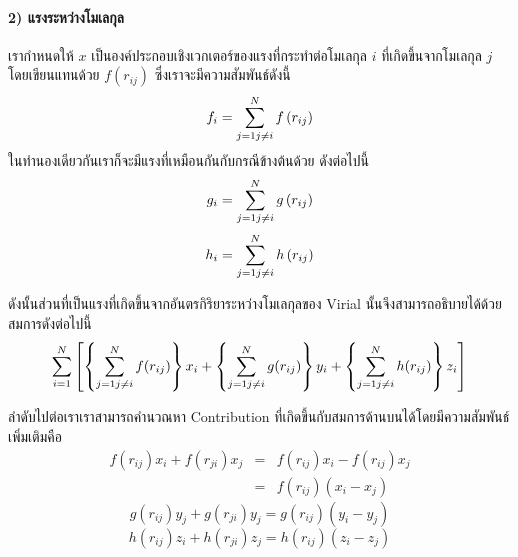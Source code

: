 \paragraph{2) แรงระหว่างโมเลกุล} เรากำหนดให้ $x$ เป็นองค์ประกอบเชิงเวกเตอร์ของแรงที่กระทำต่อโมเลกุล $i$ ที่เกิดขึ้นจากโมเลกุล $j$ โดยเขียนแทนด้วย $f(r_{ij})$ ซึ่งเราจะมีความสัมพันธ์ดังนี้
%
\begin{equation}
    f_i 
    = 
    \sum_{j=1 \\ j\neq i}^{N} f\left( r_{ij}\right)
\end{equation}
%
ในทำนองเดียวกันเราก็จะมีแรงที่เหมือนกันกับกรณีข้างต้นด้วย ดังต่อไปนี้
%
\begin{equation}
    g_i 
    = 
    \sum_{j=1 \\ j\neq i}^{N} g\left( r_{ij}\right)
\end{equation}
%
\begin{equation}
    h_i 
    = 
    \sum_{j=1 \\ j\neq i}^{N} h\left( r_{ij}\right)
\end{equation}

ดังนั้นส่วนที่เป็นแรงที่เกิดขึ้นจากอันตรกิริยาระหว่างโมเลกุลของ Virial นั้นจึงสามารถอธิบายได้ด้วยสมการดังต่อไปนี้
%
\begin{equation}
    \sum_{i=1}^{N} \left[ \left\{ \sum_{j=1 \\ j\neq i}^{N} f(r_{ij})\right\}
        x_i+\left\{ \sum_{j=1 \\ j\neq i}^{N} g(r_{ij})\right\} y_i+\left\{
        \sum_{j=1 \\ j\neq i}^{N} h(r_{ij})\right\} z_i\right]
\end{equation}

ลำดับไปต่อเราเราสามารถคำนวณหา Contribution ที่เกิดขึ้นกับสมการด้านบนได้โดยมีความสัมพันธ์เพิ่มเติมคือ
%
\begin{eqnarray}
    f\left(r_{ij}\right) x_i+f\left( r_{ji}\right) x_j & = &f\left( r_{ij}\right)
    x_i-f\left( r_{ij}\right) x_j \\
    & = &f\left( r_{ij}\right) \left( x_i-x_j\right)
\end{eqnarray}
%
\begin{equation}
    g\left(r_{ij}\right) y_j+g\left( r_{ji}\right) y_j=g\left( r_{ij}\right)
    \left(y_i-y_j\right)
\end{equation}
%
\begin{equation}
    h\left(r_{ij}\right) z_i+h\left( r_{ji}\right) z_j=h\left( r_{ij}\right)
    \left(z_i-z_j\right)
\end{equation}

